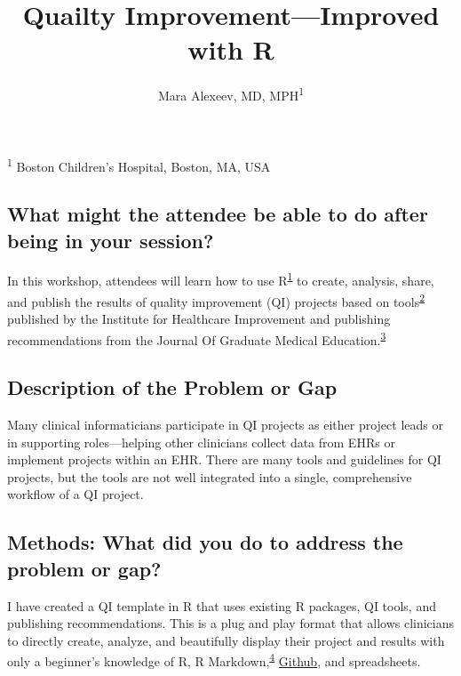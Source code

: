 \documentclass[
]{article}
\title{Quailty Improvement---Improved with R}
\author{Mara Alexeev, MD, MPH\textsuperscript{1}}
\date{}
\begin{document}
\maketitle

\textsuperscript{1} Boston Children's Hospital, Boston, MA, USA

\hypertarget{what-might-the-attendee-be-able-to-do-after-being-in-your-session}{%
\subsection{What might the attendee be able to do after being in your session?}\label{what-might-the-attendee-be-able-to-do-after-being-in-your-session}}

In this workshop, attendees will learn how to use R\textsuperscript{\protect\hyperlink{ref-R-base}{1}} to create, analysis, share, and publish the results of quality improvement (QI) projects based on tools\textsuperscript{\protect\hyperlink{ref-noauthor_quality_2017}{2}} published by the Institute for Healthcare Improvement and publishing recommendations from the Journal Of Graduate Medical Education.\textsuperscript{\protect\hyperlink{ref-wong_how_2016}{3}}

\hypertarget{description-of-the-problem-or-gap}{%
\subsection{Description of the Problem or Gap}\label{description-of-the-problem-or-gap}}

Many clinical informaticians participate in QI projects as either project leads or in supporting roles---helping other clinicians collect data from EHRs or implement projects within an EHR. There are many tools and guidelines for QI projects, but the tools are not well integrated into a single, comprehensive workflow of a QI project.

\hypertarget{methods-what-did-you-do-to-address-the-problem-or-gap}{%
\subsection{Methods: What did you do to address the problem or gap?}\label{methods-what-did-you-do-to-address-the-problem-or-gap}}

I have created a QI template in R that uses existing R packages, QI tools, and publishing recommendations. This is a plug and play format that allows clinicians to directly create, analyze, and beautifully display their project and results with only a beginner's knowledge of R, R Markdown,\textsuperscript{\protect\hyperlink{ref-R-rmarkdown}{4}} \href{github.com}{Github}, and spreadsheets.
\end{document}
